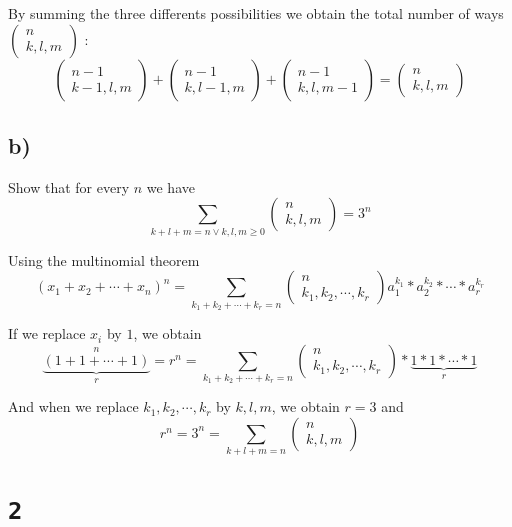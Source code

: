 \documentclass[a4paper,11pt]{report}
\begin{document}
By summing the three differents possibilities we obtain the total number of ways
$\begin{pmatrix} n \\ k,l,m\end{pmatrix}$ :
$$
  \begin{pmatrix} n-1 \\ k-1,l,m\end{pmatrix} + \begin{pmatrix} n-1 \\
    k,l-1,m\end{pmatrix} + \begin{pmatrix} n-1 \\ k,l,m-1\end{pmatrix}
  = \begin{pmatrix} n \\ k,l,m\end{pmatrix}
$$

\subsection*{b)}

Show that for every $n$ we have
$$
\sum_{k+l+m=n \vee k,l,m \geq 0} \begin{pmatrix} n \\ k,l,m\end{pmatrix} = 3^n
$$

Using the multinomial theorem
$$
(x_1 + x_2 + \cdots + x_n)^n = \sum_{k_1 + k_2 + \cdots + k_r =
  n}\begin{pmatrix} n \\ k_1,k_2,\cdots,k_r\end{pmatrix} a_1^{k_1} * a_2^{k_2} *
\cdots * a_r^{k_r}
$$

If we replace $x_i$ by $1$, we obtain
$$
\underbrace{(1 + 1 + \cdots + 1)}_r^n = r^n = \sum_{k_1 + k_2 + \cdots + k_r =
  n} \begin{pmatrix} n \\ k_1,k_2,\cdots,k_r\end{pmatrix} * \underbrace{1 * 1 * \cdots * 1}_r
$$

And when we replace ${k_1,k_2,\cdots,k_r}$ by ${k,l,m}$, we obtain $r=3$ and
$$
r^n = 3^n = \sum_{k+l+m = n} \begin{pmatrix} n \\ k,l,m\end{pmatrix}
$$

\section*{\texttt{2}}
\end{document}

